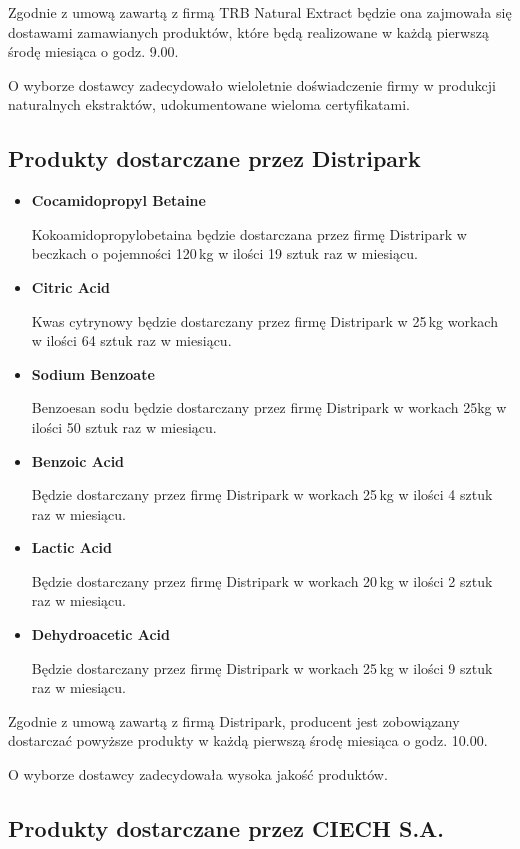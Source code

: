 	Zgodnie z umową zawartą z firmą \textsf{TRB Natural Extract} będzie ona zajmowała się dostawami zamawianych produktów, które będą realizowane w każdą pierwszą środę miesiąca o godz. 9.00.

	O wyborze dostawcy zadecydowało wieloletnie doświadczenie firmy w produkcji naturalnych ekstraktów, udokumentowane wieloma certyfikatami.



\subsection{Produkty dostarczane przez \textsf{Distripark}}

\begin{itemize}
	\item \textbf{Cocamidopropyl Betaine}

	Kokoamidopropylobetaina będzie dostarczana przez firmę \textsf{Distripark} w beczkach o pojemności 120\,kg w ilości 19 sztuk raz w miesiącu.
	\item \textbf{Citric Acid}

	Kwas cytrynowy będzie dostarczany przez firmę \textsf{Distripark} w 25\,kg workach w ilości 64 sztuk raz w miesiącu.
	\item \textbf{Sodium Benzoate}

	Benzoesan sodu będzie dostarczany przez firmę \textsf{Distripark} w workach 25kg w ilości 50 sztuk raz w miesiącu.
	\item \textbf{Benzoic Acid}

	Będzie dostarczany przez firmę \textsf{Distripark} w workach 25\,kg w ilości 4 sztuk raz w miesiącu.
	\item \textbf{Lactic Acid}

	Będzie dostarczany przez firmę \textsf{Distripark} w workach 20\,kg w ilości 2 sztuk raz w miesiącu.
	\item \textbf{Dehydroacetic Acid }

	Będzie dostarczany przez firmę \textsf{Distripark} w workach 25\,kg w ilości 9 sztuk raz w miesiącu.
\end{itemize}\vspace{\baselineskip}

	Zgodnie z umową zawartą z firmą \textsf{Distripark}, producent jest zobowiązany dostarczać powyższe produkty w każdą pierwszą środę miesiąca o godz. 10.00.

	O wyborze dostawcy zadecydowała wysoka jakość produktów.

\subsection{Produkty dostarczane przez \textsf{CIECH S.A.}}

